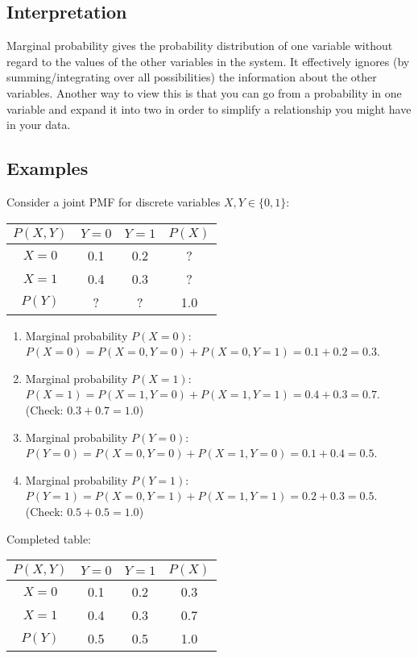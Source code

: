\documentclass{article}
\begin{document}
\subsection*{Interpretation}
Marginal probability gives the probability distribution of one variable without regard to the values of the other variables in the system. It effectively ignores (by summing/integrating over all possibilities) the information about the other variables. Another way to view this is that you can go from a probability in one variable and expand it into two in order to simplify a relationship you might have in your data.

\subsection*{Examples}
Consider a joint PMF for discrete variables $X, Y \in \{0, 1\}$:
\begin{center}
\begin{tabular}{c|cc|c}
$P(X,Y)$ & $Y=0$ & $Y=1$ & $P(X)$ \\ \hline
$X=0$ & 0.1 & 0.2 & ? \\
$X=1$ & 0.4 & 0.3 & ? \\ \hline
$P(Y)$ & ? & ? & 1.0
\end{tabular}
\end{center}
\begin{enumerate}
    \item Marginal probability $P(X=0)$: $P(X=0) = P(X=0, Y=0) + P(X=0, Y=1) = 0.1 + 0.2 = 0.3$.
    \item Marginal probability $P(X=1)$: $P(X=1) = P(X=1, Y=0) + P(X=1, Y=1) = 0.4 + 0.3 = 0.7$.
    (Check: $0.3 + 0.7 = 1.0$)
    \item Marginal probability $P(Y=0)$: $P(Y=0) = P(X=0, Y=0) + P(X=1, Y=0) = 0.1 + 0.4 = 0.5$.
    \item Marginal probability $P(Y=1)$: $P(Y=1) = P(X=0, Y=1) + P(X=1, Y=1) = 0.2 + 0.3 = 0.5$.
    (Check: $0.5 + 0.5 = 1.0$)
\end{enumerate}
Completed table:
\begin{center}
\begin{tabular}{c|cc|c}
$P(X,Y)$ & $Y=0$ & $Y=1$ & $P(X)$ \\ \hline
$X=0$ & 0.1 & 0.2 & 0.3 \\
$X=1$ & 0.4 & 0.3 & 0.7 \\ \hline
$P(Y)$ & 0.5 & 0.5 & 1.0
\end{tabular}
\end{center}
\end{document}
